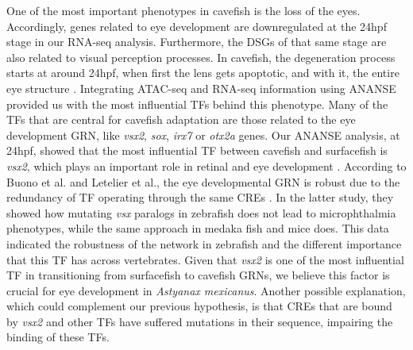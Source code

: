 One of the most important phenotypes in cavefish is the loss of the eyes. Accordingly, genes related to eye development are downregulated at the 24hpf stage in our RNA-seq analysis. Furthermore, the DSGs of that same stage are also related to visual perception processes. In cavefish, the degeneration process starts at around 24hpf, when first the lens gets apoptotic, and with it, the entire eye structure \parencite{strickler_lens_2007, krishnan_cavefish_2017, jeffery_astyanax_2020, devos_eye_2021}.  
Integrating ATAC-seq and RNA-seq information using ANANSE provided us with the most influential TFs behind this phenotype. Many of the TFs that are central for cavefish adaptation are those related to the eye development GRN, like \textit{vsx2}, \textit{sox}, \textit{irx7} or \textit{otx2a} genes. Our ANANSE analysis, at 24hpf, showed that the most influential TF between cavefish and surfacefish is \textit{vsx2}, which plays an important role in retinal and eye development \parencite{buono_analysis_2021}. According to Buono et al. and Letelier et al., the eye developmental GRN is robust due to the redundancy of TF operating through the same CREs \parencite{buono_analysis_2021, letelier_mutation_2023}. In the latter study, they showed how mutating \textit{vsx} paralogs in zebrafish does not lead to microphthalmia phenotypes, while the same approach in medaka fish and mice does. This data indicated the robustness of the network in zebrafish and the different importance that this TF has across vertebrates. Given that \textit{vsx2} is one of the most influential TF in transitioning from surfacefish to cavefish GRNs, we believe this factor is crucial for eye development in \textit{Astyanax mexicanus}. Another possible explanation, which could complement our previous hypothesis, is that CREs that are bound by \textit{vsx2} and other TFs have suffered mutations in their sequence, impairing the binding of these TFs.
